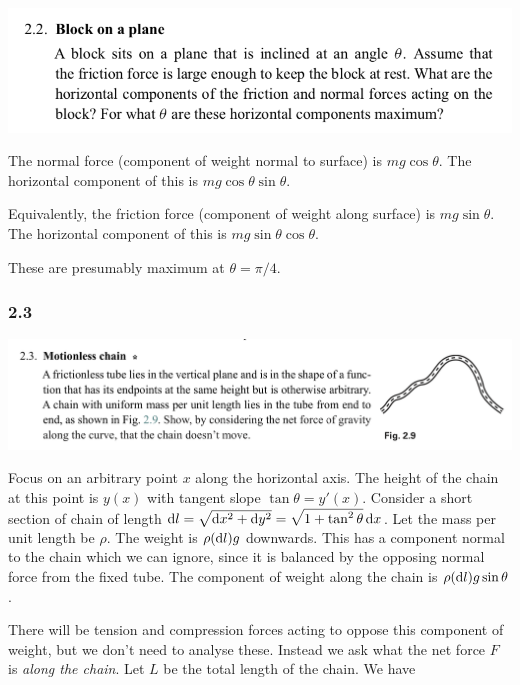 \begin{mdframed}
  \includegraphics[width=400pt]{img/physics--classical-mechanics--morin--2-2.png}
\end{mdframed}

The normal force (component of weight normal to surface) is $mg\cos\theta$. The horizontal component
of this is $mg\cos\theta\sin\theta$.

Equivalently, the friction force (component of weight along surface) is $mg\sin\theta$. The
horizontal component of this is $mg\sin\theta\cos\theta$.

These are presumably maximum at $\theta = \pi/4$. \checkmark

\newpage
\subsubsection*{2.3}
\begin{mdframed}
  \includegraphics[width=400pt]{img/physics--classical-mechanics--morin--2-3.png}
\end{mdframed}

Focus on an arbitrary point $x$ along the horizontal axis. The height of the chain at this point is
$y(x)$ with tangent slope $\tan \theta = y'(x)$. Consider a short section of chain of length
$\dl = \sqrt{\dx^2 + \dy^2} = \sqrt{1 + \tan^2\theta} \dx$. Let the mass per unit length be
$\rho$. The weight is $\rho (\dl) g$ downwards. This has a component normal to the chain which we
can ignore, since it is balanced by the opposing normal force from the fixed tube. The component of
weight along the chain is $\rho (\dl) g \sin\theta$.

There will be tension and compression forces acting to oppose this component of weight, but we don't
need to analyse these. Instead we ask what the net force $F$ is \emph{along the chain}. Let $L$ be
the total length of the chain. We have

